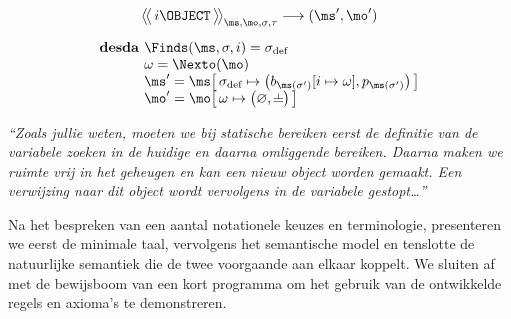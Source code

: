 \begin{htmlskip}
  \begin{multicols}{2}
    \small
    \raggedcolumns
    \setlength{\columnseprule}{.5pt}
    \begin{minipage}{.25\textwidth}\vspace*{-1.1pc}%
\begin{gather*}
  \AxiomC{$
    \Config{i \OBJECT}{\ms, \mo, \sigma, \tau}
    \longrightarrow
    (\ms', \mo')
  $}
  {\DisplayProof} \\[5pt]
  \begin{array}{r@{}l}%
    \textbf{desda } & \Finds(\ms, \sigma, i) = \sigma_\text{def} \\
    & \omega = \Nexto(\mo) \\
    & \ms' = \ms \surr{ \sigma_\text{def} \mapsto \big(b_{\ms(\sigma')}[i\mapsto \omega], p_{\ms(\sigma')}\big) } \\
    & \mo' = \mo \surr{ \omega \mapsto \big(\varnothing, \nil\big) }
  \end{array}
\end{gather*}%
    \end{minipage}
    
    \columnbreak
    
    \textit{“Zoals jullie weten, moeten we bij statische bereiken eerst de definitie van de variabele zoeken in de huidige en daarna omliggende bereiken. Daarna maken we ruimte vrij in het geheugen en kan een nieuw object worden gemaakt. Een verwijzing naar dit object wordt vervolgens in de variabele gestopt\dots”}
  \end{multicols}
\end{htmlskip}

Na het bespreken van een aantal notationele keuzes en terminologie, presenteren we eerst de minimale taal, vervolgens het semantische model en tenslotte de natuurlijke semantiek die de twee voorgaande aan elkaar koppelt.
We sluiten af met de bewijsboom van een kort programma om het gebruik van de ontwikkelde regels en axioma's te demonstreren.

